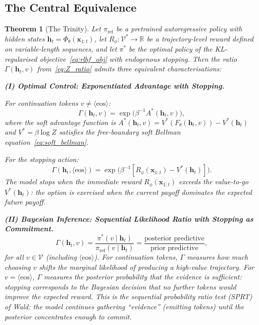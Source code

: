\documentclass[11pt,a4paper]{article}
\theoremstyle{plain}
\newtheorem{theorem}{Theorem}[section]
\theoremstyle{definition}
\theoremstyle{remark}
\newcommand{\R}{\mathbb{R}}
\newcommand{\vocab}{\mathcal{V}}
\begin{document}
\subsection{The Central Equivalence}

\begin{theorem}[The Trinity]\label{thm:trinity}
Let $\pi_{\mathrm{ref}}$ be a pretrained autoregressive policy with hidden
states $\bm{h}_t = \Phi_\theta(\bm{x}_{1:t})$, let
$R_\phi: \vocab^* \to \R$ be a trajectory-level reward defined on
variable-length sequences, and let $\pi^*$ be the optimal policy of the
KL-regularised objective~\eqref{eq:rlhf_obj} with endogenous stopping.
Then the ratio $\Gamma(\bm{h}_t, v)$ from~\eqref{eq:Z_ratio} admits
three equivalent characterisations:

\medskip
\noindent\textbf{(I) Optimal Control: Exponentiated Advantage with Stopping.}

For continuation tokens $v \neq \langle\mathrm{eos}\rangle$:
\begin{equation}\label{eq:trinity_control}
  \Gamma(\bm{h}_t, v)
  = \exp\!\bigl(\beta^{-1} A^*(\bm{h}_t, v)\bigr),
\end{equation}
where the \emph{soft advantage function} is
$A^*(\bm{h}_t, v) = V^*(F_\theta(\bm{h}_t, v)) - V^*(\bm{h}_t)$
and $V^* = \beta \log Z$ satisfies the free-boundary soft Bellman
equation~\eqref{eq:soft_bellman}.

For the stopping action:
\begin{equation}\label{eq:trinity_control_eos}
  \Gamma(\bm{h}_t, \langle\mathrm{eos}\rangle)
  = \exp\!\bigl(\beta^{-1} [R_\phi(\bm{x}_{1:t}) - V^*(\bm{h}_t)]\bigr).
\end{equation}
The model stops when the immediate reward $R_\phi(\bm{x}_{1:t})$ exceeds
the value-to-go $V^*(\bm{h}_t)$: the option is exercised when the
current payoff dominates the expected future payoff.

\medskip
\noindent\textbf{(II) Bayesian Inference: Sequential Likelihood Ratio with
Stopping as Commitment.}
\begin{equation}\label{eq:trinity_bayes}
  \Gamma(\bm{h}_t, v)
  = \frac{\pi^*(v \mid \bm{h}_t)}{\pi_{\mathrm{ref}}(v \mid \bm{h}_t)}
  = \frac{\text{posterior predictive}}{\text{prior predictive}},
\end{equation}
for all $v \in \vocab$ (including $\langle\mathrm{eos}\rangle$). For
continuation tokens, $\Gamma$ measures how much choosing $v$ shifts the
marginal likelihood of producing a high-value trajectory. For
$v = \langle\mathrm{eos}\rangle$, $\Gamma$ measures the posterior
probability that the \emph{evidence is sufficient}: stopping corresponds
to the Bayesian decision that no further tokens would improve the expected
reward. This is the \emph{sequential probability ratio test} (SPRT) of
Wald: the model continues gathering ``evidence'' (emitting tokens) until
the posterior concentrates enough to commit.


\end{theorem}
\end{document}
